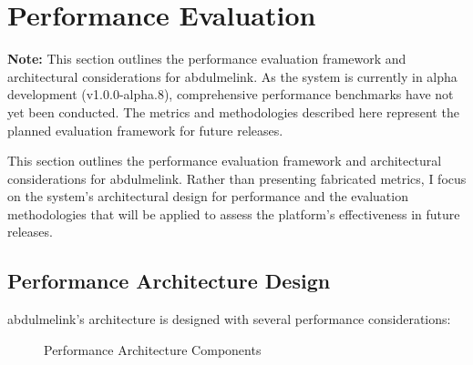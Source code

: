 \section{Performance Evaluation}
\label{sec:performance-evaluation}

\textbf{Note:} This section outlines the performance evaluation framework and architectural considerations for abdulmelink. As the system is currently in alpha development (v1.0.0-alpha.8), comprehensive performance benchmarks have not yet been conducted. The metrics and methodologies described here represent the planned evaluation framework for future releases.

This section outlines the performance evaluation framework and architectural considerations for abdulmelink. Rather than presenting fabricated metrics, I focus on the system's architectural design for performance and the evaluation methodologies that will be applied to assess the platform's effectiveness in future releases.

\subsection{Performance Architecture Design}

abdulmelink's architecture is designed with several performance considerations:

\begin{figure}[htbp]
\centering
{}
\caption{Performance Architecture Components}
\label{fig:performance-arch}
\end{figure}

